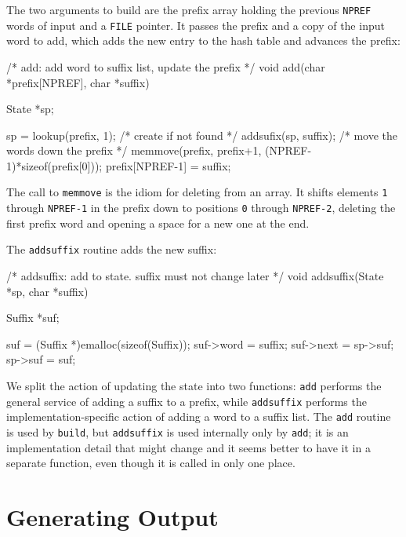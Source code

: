 The two arguments to build are the prefix array holding the previous
\verb'NPREF' words of input and a \verb'FILE' pointer. It passes the prefix
and a copy of the input word to add, which adds the new entry to the hash
table and advances the prefix:
\begin{wellcode}
    /* add: add word to suffix list, update the prefix */
    void add(char *prefix[NPREF], char *suffix)
    {
        State   *sp;

        sp = lookup(prefix, 1); /* create if not found */
        addsufix(sp, suffix);
        /* move the words down the prefix */
        memmove(prefix, prefix+1, (NPREF-1)*sizeof(prefix[0]));
        prefix[NPREF-1] = suffix;
    }
\end{wellcode}

The call to \verb'memmove' is the idiom for deleting from an array. It
shifts elements \verb'1' through \verb'NPREF-1' in the prefix down to
positions \verb'0' through \verb'NPREF-2', deleting the first prefix word
and opening a space for a new one at the end.

The \verb'addsuffix' routine adds the new suffix:
\begin{wellcode}
    /* addsuffix: add to state. suffix must not change later */
    void addsuffix(State *sp, char *suffix)
    {
        Suffix  *suf;

        suf = (Suffix *)emalloc(sizeof(Suffix));
        suf->word = suffix;
        suf->next = sp->suf;
        sp->suf = suf;
    }
\end{wellcode}
We split the action of updating the state into two functions: \verb'add'
performs the general service of adding a suffix to a prefix, while
\verb'addsuffix' performs the implementation-specific action of adding a
word to a suffix list. The \verb'add' routine is used by \verb'build', but
\verb'addsuffix' is used internally only by \verb'add'; it is an
implementation detail that might change and it seems better to have it in a
separate function, even though it is called in only one place.

\section{Generating Output}
\label{sec:generating_output}

